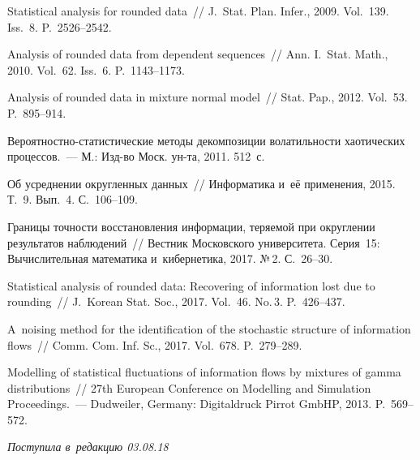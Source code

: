 \begin{multicols}{2}
{{\begin{thebibliography}{99}
\columnbreak

  
Statistical analysis for rounded data~// J.~Stat. Plan.  Infer., 2009. 
Vol.~139. Iss.~8. P.~2526--2542.

  
Analysis of rounded data from dependent sequences~// 
Ann. I.~Stat. Math., 2010. Vol.~62. Iss.~6. P.~1143--1173.

  
Analysis of rounded data in mixture normal model~// Stat. Pap., 2012. 
Vol.~53. P.~895--914.

  
Ве\-ро\-ят\-но\-ст\-но-ста\-ти\-сти\-че\-ские методы декомпозиции волатильности 
хаотических процессов.~--- М.: Изд-во Моск. ун-та, 2011. 512~с.

  
Об усреднении округленных данных~// Информатика и~её применения, 2015. Т.~9. 
Вып.~4. С.~106--109.

  
Границы точ\-ности восстановления информации, 
теряемой при округлении результатов наблюдений~// 
Вестник Московского университета. Серия~15: Вычислительная математика и~кибернетика, 
2017. №\,2. С.~26--30.

  
Statistical analysis of rounded data: Recovering of information lost due to rounding~// 
J.~Korean Stat. Soc., 2017.  Vol.~46. No.\,3. P.~426--437.

  
A~noising method for the identification of the stochastic structure of 
information flows~// Comm. Com. Inf. Sc., 2017. 
Vol.~678. P.~279--289.

 Modelling of statistical
fluctuations of information flows by mixtures of gamma distributions~// 
27th European Conference on Modelling and Simulation Proceedings.~--- 
Dudweiler, Germany: Digitaldruck Pirrot GmbHP, 2013. P.~569--572.
 \end{thebibliography}

 }
 }

\end{multicols}

\vspace*{-6pt}

\hfill{\small\textit{Поступила в~редакцию 03.08.18}}

